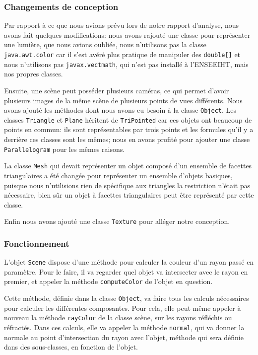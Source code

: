 \documentclass[a4paper]{article}
\begin{document}
    \subsubsection{Changements de conception}
      Par rapport à ce que nous avions prévu lors de notre rapport d'analyse,
      nous avons fait quelques modifications: nous avons rajouté une classe
      pour représenter une lumière, que nous avions oubliée, nous n'utilisons
      pas la classe \verb+java.awt.color+ car il s'est avéré plus pratique de
      manipuler des \verb+double[]+ et nous n'utilisons pas
      \verb+javax.vectmath+, qui n'est pas installé à l'ENSEEIHT, mais nos
      propres classes.

      Ensuite, une scène peut posséder plusieurs caméras, ce qui permet d'avoir
      plusieurs images de la même scène de plusieurs points de vues différents.
      Nous avons ajouté les méthodes dont nous avons eu besoin à la classe
      \verb+Object+. Les classes \verb+Triangle+ et \verb+Plane+ héritent de
      \verb+TriPointed+ car ces objets ont beaucoup de points en commun: ils
      sont représentables par trois points et les formules qu'il y a derrière
      ces classes sont les mêmes; nous en avons profité pour ajouter une classe
      \verb+Parallelogram+ pour les mêmes raisons.
      
      La classe \verb+Mesh+ qui
      devait représenter un objet composé d'un ensemble de facettes
      triangulaires a été changée pour représenter un ensemble d'objets
      basiques, puisque nous n'utilisions rien de spécifique aux triangles la
      restriction n'était pas nécessaire, bien sûr un objet à facettes
      triangulaires peut être représenté par cette classe.
      
      Enfin nous avons ajouté une classe \verb+Texture+ pour alléger notre
      conception.

    \subsubsection{Fonctionnement}
      L'objet \verb+Scene+ dispose d'une méthode pour calculer la couleur
      d'un rayon passé en paramètre.
      Pour le faire, il va regarder quel objet va intersecter avec le rayon en
      premier, et appeler la méthode \verb+computeColor+ de l'objet en question.

      Cette méthode, définie dans la classe \verb+Object+, va faire tous les
      calculs nécessaires pour calculer les différentes composantes. Pour cela,
      elle peut même appeler à nouveau la méthode \verb+rayColor+ de la classe
      scène, sur les rayons réfléchis ou réfractés.
      Dans ces calculs, elle va appeler la méthode \verb+normal+, qui va donner
      la normale au point d'intersection du rayon avec l'objet, méthode qui sera
      définie dans des sous-classes, en fonction de l'objet.
\end{document}
